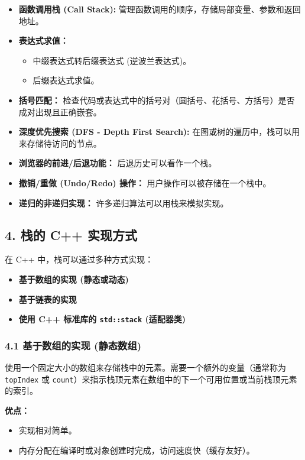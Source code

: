 \begin{itemize}
	\item \textbf{函数调用栈 (Call Stack):} 管理函数调用的顺序，存储局部变量、参数和返回地址。
	\item \textbf{表达式求值：}
	\begin{itemize}
		\item 中缀表达式转后缀表达式 (逆波兰表达式)。
		\item 后缀表达式求值。
	\end{itemize}
	\item \textbf{括号匹配：} 检查代码或表达式中的括号对（圆括号、花括号、方括号）是否成对出现且正确嵌套。
	\item \textbf{深度优先搜索 (DFS - Depth First Search):} 在图或树的遍历中，栈可以用来存储待访问的节点。
	\item \textbf{浏览器的前进/后退功能：} 后退历史可以看作一个栈。
	\item \textbf{撤销/重做 (Undo/Redo) 操作：} 用户操作可以被存储在一个栈中。
	\item \textbf{递归的非递归实现：} 许多递归算法可以用栈来模拟实现。
\end{itemize}

\subsection{4. 栈的 C++ 实现方式}

在 C++ 中，栈可以通过多种方式实现：

\begin{itemize}
	\item \textbf{基于数组的实现 (静态或动态)}
	\item \textbf{基于链表的实现}
	\item \textbf{使用 C++ 标准库的 \lstinline{std::stack} (适配器类)}
\end{itemize}

\subsubsection{4.1 基于数组的实现 (静态数组)}

使用一个固定大小的数组来存储栈中的元素。需要一个额外的变量（通常称为 \lstinline{topIndex} 或 \lstinline{count}）来指示栈顶元素在数组中的下一个可用位置或当前栈顶元素的索引。

\textbf{优点：}

\begin{itemize}
	\item 实现相对简单。
	\item 内存分配在编译时或对象创建时完成，访问速度快（缓存友好）。
\end{itemize}

